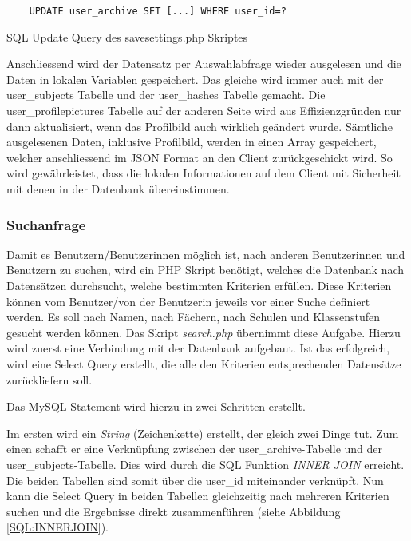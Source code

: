 \documentclass[../main.tex]{subfiles}
\begin{document}
	 \begin{code} 
	 	\begin{center}
	 		\begin{verbatim}
	UPDATE user_archive SET [...] WHERE user_id=?
	 		\end{verbatim}
	 		\caption{SQL Update Query des savesettings.php Skriptes}\label{SQL:UPDATE}
	 	\end{center}
	 \end{code}
	 
	 Anschliessend wird der Datensatz per Auswahlabfrage wieder ausgelesen und die Daten in lokalen Variablen gespeichert. Das gleiche wird immer auch mit der user\_subjects Tabelle und der user\_hashes Tabelle gemacht. Die user\_profilepictures Tabelle auf der anderen Seite wird aus Effizienzgründen nur dann aktualisiert, wenn das Profilbild auch wirklich geändert wurde. Sämtliche ausgelesenen Daten, inklusive Profilbild, werden in einen Array gespeichert, welcher anschliessend im JSON Format an den Client zurückgeschickt wird. So wird gewährleistet, dass die lokalen Informationen auf dem Client mit Sicherheit mit denen in der Datenbank übereinstimmen.
	 
	 \subsubsection{Suchanfrage} \label{PHP:Suchanfrage}
	 Damit es Benutzern/Benutzerinnen möglich ist, nach anderen Benutzerinnen und Benutzern zu suchen, wird ein PHP Skript benötigt, welches die Datenbank nach Datensätzen durchsucht, welche bestimmten Kriterien erfüllen. Diese Kriterien können vom Benutzer/von der Benutzerin jeweils vor einer Suche definiert werden. Es soll nach Namen, nach Fächern, nach Schulen und Klassenstufen gesucht werden können. Das Skript \emph{search.php} übernimmt diese Aufgabe. Hierzu wird zuerst eine Verbindung mit der Datenbank aufgebaut. Ist das erfolgreich, wird eine Select Query erstellt, die alle den Kriterien entsprechenden Datensätze zurückliefern soll. 
	 
	 Das MySQL Statement wird hierzu in zwei Schritten erstellt.
	 
	 Im ersten wird ein \emph{String} (Zeichenkette) erstellt, der gleich zwei Dinge tut. Zum einen schafft er eine Verknüpfung zwischen der user\_archive-Tabelle und der user\_subjects-Tabelle. Dies wird durch die SQL Funktion \emph{INNER JOIN} erreicht. Die beiden Tabellen sind somit über die user\_id miteinander verknüpft. Nun kann die Select Query in beiden Tabellen gleichzeitig nach mehreren Kriterien suchen und die Ergebnisse direkt zusammenführen (siehe Abbildung \ref{SQL:INNERJOIN}).
	 
\end{document}
